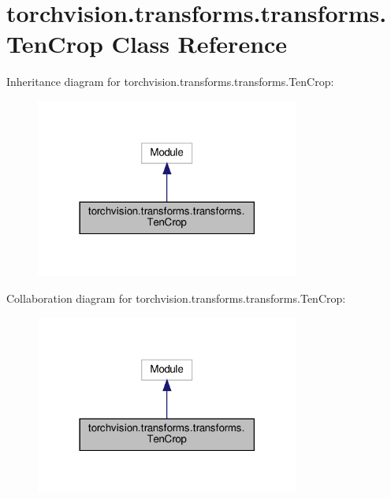 \hypertarget{classtorchvision_1_1transforms_1_1transforms_1_1TenCrop}{}\section{torchvision.\+transforms.\+transforms.\+Ten\+Crop Class Reference}
\label{classtorchvision_1_1transforms_1_1transforms_1_1TenCrop}


Inheritance diagram for torchvision.\+transforms.\+transforms.\+Ten\+Crop\+:
\nopagebreak
\begin{figure}[H]
\begin{center}
\leavevmode
\includegraphics[width=246pt]{classtorchvision_1_1transforms_1_1transforms_1_1TenCrop__inherit__graph}
\end{center}
\end{figure}


Collaboration diagram for torchvision.\+transforms.\+transforms.\+Ten\+Crop\+:
\nopagebreak
\begin{figure}[H]
\begin{center}
\leavevmode
\includegraphics[width=246pt]{classtorchvision_1_1transforms_1_1transforms_1_1TenCrop__coll__graph}
\end{center}
\end{figure}
